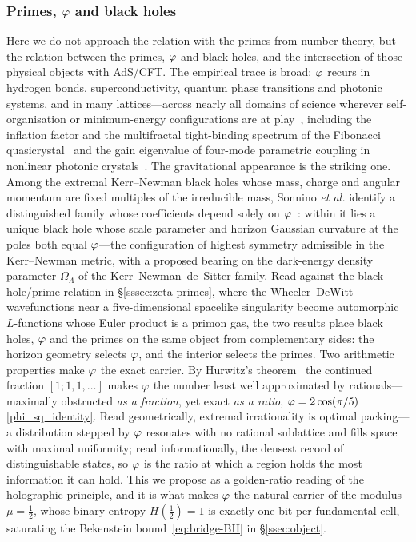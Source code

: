 \subsubsection{Primes, $\varphi$ and black holes}
Here we do not approach the relation with the primes from number theory, but the relation
between the primes, $\varphi$ and black holes, and the intersection of those physical objects
with AdS/CFT. The empirical trace is broad: $\varphi$ recurs in hydrogen bonds,
superconductivity, quantum phase transitions and photonic systems, and in many
lattices---across nearly all domains of science wherever self-organisation or
minimum-energy configurations are at play~\cite{Pletser2018},
including the inflation factor and the multifractal tight-binding spectrum of the Fibonacci
quasicrystal~\cite{Jagannathan2021} and the gain eigenvalue of four-mode parametric coupling
in nonlinear photonic crystals~\cite{Jedrkiewicz2018}. The gravitational appearance is the
striking one. Among the extremal Kerr--Newman black holes whose mass, charge and angular
momentum are fixed multiples of the irreducible mass, Sonnino \emph{et al.} identify a
distinguished family whose coefficients depend solely on $\varphi$~\cite{Sonnino2024}: within
it lies a unique black hole whose scale parameter and horizon Gaussian curvature at the poles
both equal $\varphi$---the configuration of highest symmetry admissible in the Kerr--Newman
metric, with a proposed bearing on the dark-energy density parameter $\Omega_\Lambda$ of the
Kerr--Newman--de~Sitter family. Read against the black-hole/prime relation in
\S\ref{sssec:zeta-primes}, where the Wheeler--DeWitt wavefunctions near a five-dimensional
spacelike singularity become automorphic $L$-functions whose Euler product is a primon gas,
the two results place black holes, $\varphi$ and the primes on the same object from
complementary sides: the horizon geometry selects $\varphi$, and the interior selects the
primes. Two arithmetic properties make $\varphi$ the exact carrier. By Hurwitz's
theorem~\cite{Hurwitz1891} the continued fraction $[1;1,1,\dots]$ makes $\varphi$ the number
least well approximated by rationals---maximally obstructed \emph{as a fraction}, yet exact
\emph{as a ratio}, $\varphi=2\cos(\pi/5)$ \eqref{phi_sq_identity}. Read geometrically, extremal
irrationality is optimal packing---a distribution stepped by $\varphi$ resonates with no
rational sublattice and fills space with maximal uniformity; read informationally, the
densest record of distinguishable states, so $\varphi$ is the ratio at which a region holds
the most information it can hold. This we propose as a golden-ratio reading of the
holographic principle, and it is what makes $\varphi$ the natural carrier of the modulus
$\mu=\tfrac12$, whose binary entropy $H(\tfrac12)=1$ is exactly one bit per fundamental cell,
saturating the Bekenstein bound~\eqref{eq:bridge-BH} in \S\ref{ssec:object}.

